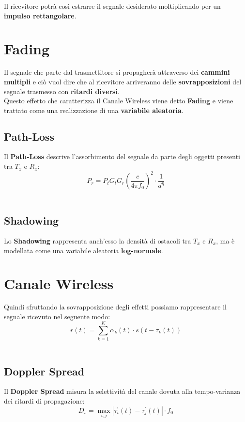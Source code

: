 Il ricevitore potrà così estrarre il segnale desiderato moltiplicando per un \textbf{impulso rettangolare}.

\section{Fading}
Il segnale che parte dal trasmettitore si propagherà attraverso dei \textbf{cammini multipli} e ciò vuol dire che al ricevitore arriveranno delle \textbf{sovrapposizioni} del segnale trasmesso con \textbf{ritardi diversi}.\\

Questo effetto che caratterizza il Canale Wireless viene detto \textbf{Fading} e viene trattato come una realizzazione di una \textbf{variabile aleatoria}.
\\

\subsection{Path-Loss}
Il \textbf{Path-Loss} descrive l'assorbimento del segnale da parte degli oggetti presenti tra $T_x$ e $R_x$:
\begin{equation*}
    P_r = P_t G_t G_r \left(\frac{c}{4\pi f_0}\right)^2 \cdot \frac{1}{d^\eta}
\end{equation*}
\\

\subsection{Shadowing}
Lo \textbf{Shadowing} rappresenta anch'esso la densità di ostacoli tra $T_x$ e $R_x$, ma è modellata come una variabile aleatoria \textbf{log-normale}.


\section{Canale Wireless}
Quindi sfruttando la sovrapposizione degli effetti possiamo rappresentare il segnale ricevuto nel seguente modo:
\begin{equation*}
    r(t) = \sum_{k=1}^K \alpha_k(t) \cdot s(t-\tau_k(t))
\end{equation*}
\\

\subsection{Doppler Spread}
Il \textbf{Doppler Spread} misura la selettività del canale dovuta alla tempo-varianza dei ritardi di propagazione:
\begin{equation*}
    D_s = \max_{i,j} \left|\tau_i^{'}(t) - \tau_j^{'}(t) \right| \cdot f_0
\end{equation*}
\\

